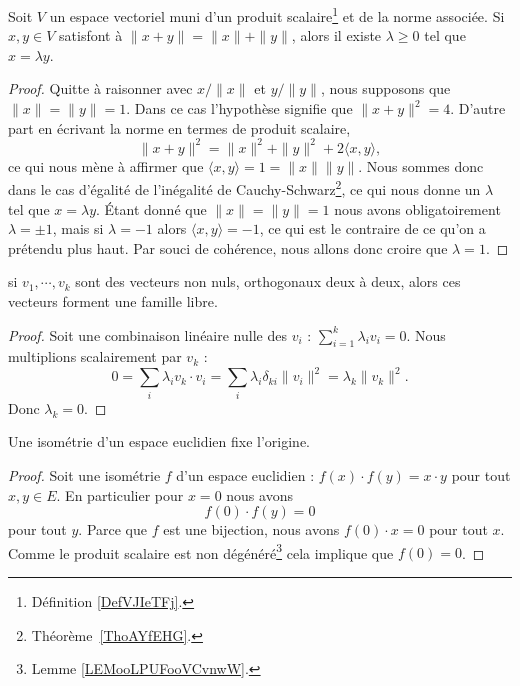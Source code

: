 \begin{lemma}   \label{LemLPOHUme}
	Soit \( V\) un espace vectoriel muni d'un produit scalaire\footnote{Définition \ref{DefVJIeTFj}.} et de la norme associée. Si \( x,y\in V\) satisfont à \( \| x+y \|=\| x \|+\| y \|\), alors il existe \( \lambda\geq 0\) tel que \( x=\lambda y\).
\end{lemma}

\begin{proof}
	Quitte à raisonner avec \( x/\| x \|\) et \( y/\| y \|\), nous supposons que \( \| x \|=\| y \|=1\). Dans ce cas l'hypothèse signifie que \( \| x+y \|^2=4\). D'autre part en écrivant la norme en termes de produit scalaire,
	\begin{equation}
		\| x+y \|^2=\| x \|^2+\| y \|^2+2\langle x, y\rangle ,
	\end{equation}
	ce qui nous mène à affirmer que \( \langle x, y\rangle =1=\| x \|\| y \|\). Nous sommes donc dans le cas d'égalité de l'inégalité de Cauchy-Schwarz\footnote{Théorème~\ref{ThoAYfEHG}.}, ce qui nous donne un \( \lambda\) tel que \( x=\lambda y\). Étant donné que \( \| x \|=\| y \|=1\) nous avons obligatoirement \( \lambda=\pm 1\), mais si \( \lambda=-1\) alors \( \langle x, y\rangle =-1\), ce qui est le contraire de ce qu'on a prétendu plus haut. Par souci de cohérence, nous allons donc croire que \( \lambda=1\).
\end{proof}

\begin{proposition}     \label{PropVectsOrthLibres}
	si \( v_1,\cdots,v_k\) sont des vecteurs non nuls, orthogonaux deux à deux, alors ces vecteurs forment une famille libre.
\end{proposition}

\begin{proof}
	Soit une combinaison linéaire nulle des \( v_i\) : \( \sum_{i=1}^k\lambda_iv_i=0\). Nous multiplions scalairement par \( v_k\) :
	\begin{equation}
		0=\sum_i\lambda_iv_k\cdot v_i=\sum_i\lambda_i\delta_{ki}\| v_i \|^2=\lambda_k\| v_k \|^2.
	\end{equation}
	Donc \( \lambda_k=0\).
\end{proof}

\begin{lemma}       \label{LEMooYXJZooWKRFRu}
	Une isométrie d'un espace euclidien fixe l'origine.
\end{lemma}

\begin{proof}
	Soit une isométrie \( f\) d'un espace euclidien : \( f(x)\cdot f(y)=x\cdot y\) pour tout \( x,y\in E\). En particulier pour \( x=0\) nous avons
	\begin{equation}
		f(0)\cdot f(y)=0
	\end{equation}
	pour tout \( y\). Parce que \( f\) est une bijection, nous avons \( f(0)\cdot x=0\) pour tout \( x\). Comme le produit scalaire est non dégénéré\footnote{Lemme \ref{LEMooLPUFooVCvnwW}.} cela implique que \( f(0)=0\).
\end{proof}

